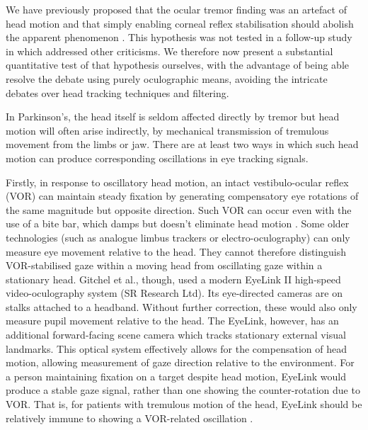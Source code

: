 \documentclass[jou,a4paper]{apa6}
\begin{document}
We have previously proposed that the ocular tremor finding was an artefact of head motion and that simply enabling corneal reflex stabilisation should abolish the apparent phenomenon \citep{MacAskill2013Ocular-tremor-i}. This hypothesis was not tested in a follow-up study in which \citet{Gitchel2014Experimental-su} addressed other criticisms. We therefore now present a substantial quantitative test of that hypothesis ourselves, with the advantage of being able resolve the debate using purely oculographic means, avoiding the intricate debates over head tracking techniques and filtering.

In Parkinson's, the head itself is seldom affected directly by tremor but head motion will often arise indirectly, by mechanical transmission of tremulous movement from the limbs or jaw. There are at least two ways in which such head motion can produce corresponding oscillations in eye tracking signals. 

Firstly, in response to oscillatory head motion, an intact vestibulo-ocular reflex (VOR) can maintain steady fixation by generating compensatory eye rotations of the same magnitude but opposite direction. Such VOR can occur even with the use of a bite bar, which damps but doesn't eliminate head motion \citep{Saifee2014Tremor-of-the-e}. Some older technologies (such as analogue limbus trackers or electro-oculography) can only measure eye movement relative to the head. They cannot therefore distinguish VOR-stabilised gaze within a moving head from oscillating gaze within a stationary head. Gitchel et al., though, used a modern EyeLink II high-speed video-oculography system (SR Research Ltd). Its eye-directed cameras are on stalks attached to a headband. Without further correction, these would also only measure pupil movement relative to the head. The EyeLink, however, has an additional forward-facing scene camera which tracks stationary external visual landmarks. This optical system effectively allows for the compensation of head motion, allowing measurement of gaze direction relative to the environment. For a person maintaining fixation on a target despite head motion, EyeLink would produce a stable gaze signal, rather than one showing the counter-rotation due to VOR. That is, for patients with tremulous motion of the head, EyeLink should be relatively immune to showing a VOR-related oscillation \citep[counter to ourselves and others previously implicating the VOR as being the artefactual basis of ``ocular tremor'' ][]{Kaski2013Eye-oscillation,Kaski2013Ocular-tremor-i,MacAskill2013Ocular-tremor-i}.
\end{document}
